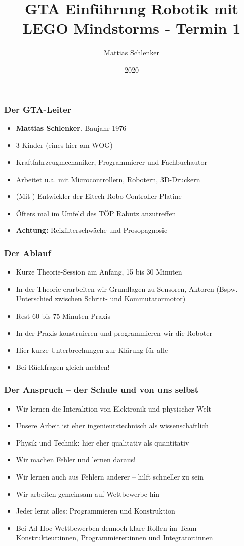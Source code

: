 \documentclass{beamer}
\title{GTA Einführung Robotik mit LEGO Mindstorms - Termin 1}
\author{Mattias Schlenker}
\institute{Wilhelm-Ostwald-Gymnasium}
\date{2020}
\begin{document}
\frame{\titlepage}

\begin{frame}
\frametitle{Der GTA-Leiter}
\begin{itemize}
\item \textbf{Mattias Schlenker}, Baujahr 1976
\item 3 Kinder (eines hier am WOG) 
\item Kraftfahrzeugmechaniker, Programmierer und Fachbuchautor 
\item Arbeitet u.a. mit Microcontrollern, \href{https://www.youtube.com/watch?v=-ncd1DkRh1M}{Robotern}, 3D-Druckern 
\item (Mit-) Entwickler der Eitech Robo Controller Platine  
\item Öfters mal im Umfeld des TÖP Rabutz anzutreffen
\item \textbf{Achtung:} Reizfilterschwäche und Prosopagnosie
\end{itemize}
\end{frame}

\begin{frame}
\frametitle{Der Ablauf}
\begin{itemize}
\item Kurze Theorie-Session am Anfang, 15 bis 30 Minuten
\item In der Theorie erarbeiten wir Grundlagen zu Sensoren, Aktoren 
(Bspw. Unterschied zwischen Schritt- und Kommutatormotor)
\item Rest 60 bis 75 Minuten Praxis 
\item In der Praxis konstruieren und programmieren wir die Roboter
\item Hier kurze Unterbrechungen zur Klärung für alle 
\item Bei Rückfragen gleich melden!
\end{itemize}
\end{frame}

\begin{frame}
\frametitle{Der Anspruch – der Schule und von uns selbst}
\begin{itemize}
\item  Wir lernen die Interaktion von Elektronik und physischer Welt
\item  Unsere Arbeit ist eher ingenieurstechnisch als wissenschaftlich
\item Physik und Technik: hier eher qualitativ als quantitativ
\item  Wir machen Fehler und lernen daraus!
\item Wir lernen auch aus Fehlern anderer – hilft schneller zu sein
\item  Wir arbeiten gemeinsam auf Wettbewerbe hin
\item  Jeder lernt alles: Programmieren und Konstruktion 
\item  Bei Ad-Hoc-Wettbewerben dennoch klare Rollen im Team – Konstrukteur:innen, Programmierer:innen und Integrator:innen 
\end{itemize}
\end{frame}
\end{document}
